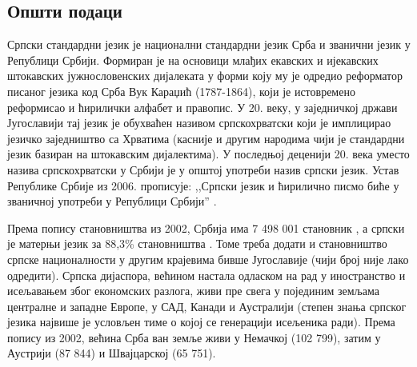 {\begin{multicols}{2}
\end{multicols}

\clearpage

\begin{multicols}{2}


\subsection{Општи подаци}


Српски стандардни језик је национални стандардни језик Срба и званични језик у Републици Србији. Формиран је на основици млађих екавских и ијекавских штокавских јужнословенских дијалеката у форми коју му је одредио реформатор писаног језика код Срба Вук Караџић (1787-1864), који је истовремено реформисао и ћирилички алфабет и правопис. У 20. веку,  у заједничкој држави Југославији тај језик је обухваћен називом српскохрватски који је имплицирао језичко заједништво са Хрватима (касније и другим народима чији је стандардни језик базиран на штокавским дијалектима). У последњој деценији 20. века уместо назива српскохрватски у Србији је у општој употреби  назив српски језик. Устав Републике Србије из 2006. прописује: ,,Српски језик и ћирилично писмо биће у званичној употреби у Републици Србији'' \cite{Ustav}.

Према попису становништва из 2002, Србија има 7 498 001 становник \cite{VJN3}, а српски је матерњи језик за 88,3\% становништва \cite{HDR}. Томе треба додати и становништво српске националности у другим крајевима бивше Југославије (чији  број није лако одредити). Српска дијаспора, већином настала одласком на рад у иностранство и исељавањем због економских разлога, живи пре свега у појединим земљама централне и западне Европе, у САД, Канади и Аустралији (степен знања српског језика највише је у\-сло\-вљен тиме о којој се генерацији исељеника ради). Према попису из 2002, већина Срба ван земље живи у Немачкој (102 799), затим у Аустрији (87 844) и Швајцарској (65 751). 



\end{multicols}}
